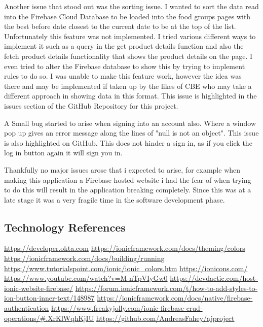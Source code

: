 Another issue that stood out was the sorting issue. I wanted to sort the data read into the Firebase Cloud Database to be loaded into the food groups pages with the best before date closest to the current date to be at the top of the list. Unfortunately this feature was not implemented. I tried various different ways to implement it such as a query in the get product details function and also the fetch product details functionality that shows the product details on the page. I even tried to alter the Firebase database to show this by trying to implement rules to do so. I was unable to make this feature work, however the idea was there and may be implemented if taken up by the likes of CBE who may take a different approach in showing data in this format. This issue is highlighted in the issues section of the GitHub Repository for this project.
\newline

A Small bug started to arise when signing into an account also. Where a window pop up gives an error message along the lines of "null is not an object". This issue is also highlighted on GitHub. This does not hinder a sign in, as if you click the log in button again it will sign you in.
\newline

Thankfully no major issues arose that i expected to arise, for example when making this application a Firebase hosted website i had the fear of when trying to do this will result in the application breaking completely. Since this was at a late stage it was a very fragile time in the software development phase. 

\newpage
\subsection{Technology References}
\url{https://developer.okta.com}
\newline
\url{https://ionicframework.com/docs/theming/colors}
\newline
\url{https://ionicframework.com/docs/building/running}
\newline
\url{https://www.tutorialspoint.com/ionic/ionic_colors.htm}
\newline
\url{https://ionicons.com/}
\newline
\url{https://www.youtube.com/watch?v=M-nTpVIyGw0}
\newline
\url{https://devdactic.com/host-ionic-website-firebase/}
\newline
\url{https://forum.ionicframework.com/t/how-to-add-styles-to-ion-button-inner-text/148987}
\newline
\url{https://ionicframework.com/docs/native/firebase-authentication}
\newline
\url{https://www.freakyjolly.com/ionic-firebase-crud-operations/#.XrKlWqhKjIU}
\newline
\url{https://github.com/AndreasFahey/ajproject}

